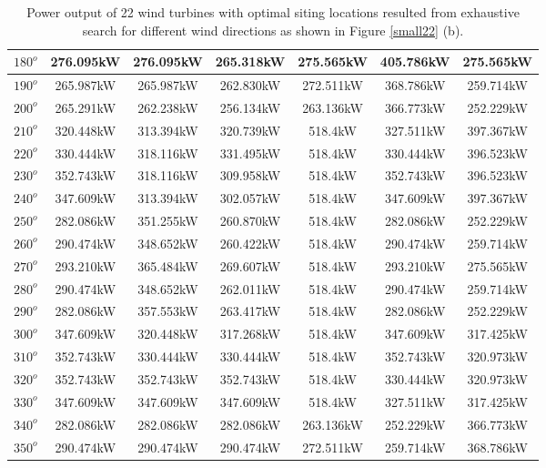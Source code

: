 \begin{table}[H]
\begin{tabular}{|c|c|c|c|c|c|c|}
		$180^o$	& 276.095kW	& 276.095kW	& 265.318kW	& 275.565kW	& 405.786kW	& 275.565kW	\\ \hline
		$190^o$	& 265.987kW	& 265.987kW	& 262.830kW	& 272.511kW	& 368.786kW	& 259.714kW	\\ \hline
		$200^o$	& 265.291kW	& 262.238kW	& 256.134kW	& 263.136kW	& 366.773kW	& 252.229kW	\\ \hline
		$210^o$	& 320.448kW	& 313.394kW	& 320.739kW	& 518.4kW	& 327.511kW	& 397.367kW	\\ \hline
		$220^o$	& 330.444kW	& 318.116kW	& 331.495kW	& 518.4kW	& 330.444kW	& 396.523kW	\\ \hline
		$230^o$	& 352.743kW	& 318.116kW	& 309.958kW	& 518.4kW	& 352.743kW	& 396.523kW	\\ \hline
		$240^o$	& 347.609kW	& 313.394kW	& 302.057kW	& 518.4kW	& 347.609kW	& 397.367kW	\\ \hline
		$250^o$	& 282.086kW	& 351.255kW	& 260.870kW	& 518.4kW	& 282.086kW	& 252.229kW	\\ \hline
		$260^o$	& 290.474kW	& 348.652kW	& 260.422kW	& 518.4kW	& 290.474kW	& 259.714kW	\\ \hline
		$270^o$	& 293.210kW	& 365.484kW	& 269.607kW	& 518.4kW	& 293.210kW	& 275.565kW	\\ \hline
		$280^o$	& 290.474kW	& 348.652kW	& 262.011kW	& 518.4kW	& 290.474kW	& 259.714kW	\\ \hline
		$290^o$	& 282.086kW	& 357.553kW	& 263.417kW	& 518.4kW	& 282.086kW	& 252.229kW	\\ \hline
		$300^o$	& 347.609kW	& 320.448kW	& 317.268kW	& 518.4kW	& 347.609kW	& 317.425kW	\\ \hline
		$310^o$	& 352.743kW	& 330.444kW	& 330.444kW	& 518.4kW	& 352.743kW	& 320.973kW	\\ \hline
		$320^o$	& 352.743kW	& 352.743kW	& 352.743kW	& 518.4kW	& 330.444kW	& 320.973kW	\\ \hline
		$330^o$	& 347.609kW	& 347.609kW	& 347.609kW	& 518.4kW	& 327.511kW	& 317.425kW	\\ \hline
		$340^o$	& 282.086kW	& 282.086kW	& 282.086kW	& 263.136kW	& 252.229kW	& 366.773kW	\\ \hline
		$350^o$	& 290.474kW	& 290.474kW	& 290.474kW	& 272.511kW	& 259.714kW	& 368.786kW	\\ \hline
        	\end{tabular}
        	\caption{Power output of 22 wind turbines with optimal siting locations resulted from exhaustive search for different wind directions as shown in Figure \ref{small22} (b).}
        	\label{table22b}
        \end{table}
